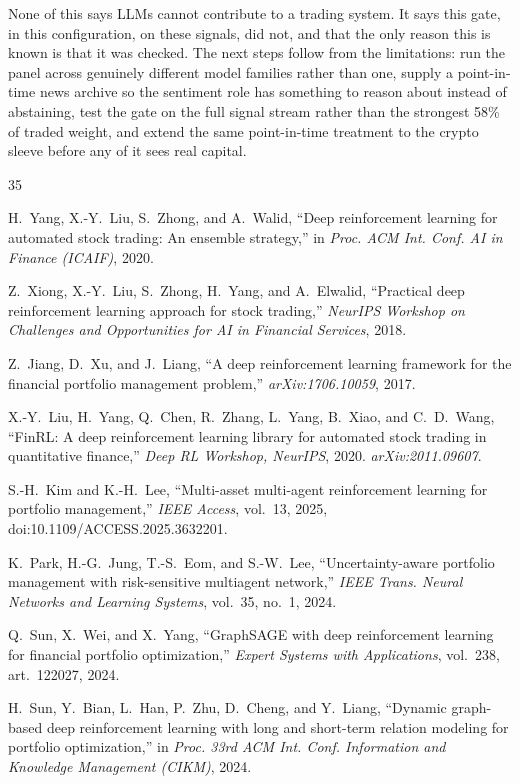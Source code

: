 \documentclass[10pt,twocolumn]{IEEEtran}
\begin{document}
None of this says LLMs cannot contribute to a trading system. It says this
gate, in this configuration, on these signals, did not, and that the only
reason this is known is that it was checked. The next steps follow from the
limitations: run the panel across genuinely different model families rather
than one, supply a point-in-time news archive so the sentiment role has
something to reason about instead of abstaining, test the gate on the full
signal stream rather than the strongest 58\% of traded weight, and extend the
same point-in-time treatment to the crypto sleeve before any of it sees real
capital.

\begin{thebibliography}{35}

H.~Yang, X.-Y.~Liu, S.~Zhong, and A.~Walid, ``Deep reinforcement learning
for automated stock trading: An ensemble strategy,'' in \emph{Proc. ACM
Int. Conf. AI in Finance (ICAIF)}, 2020.

Z.~Xiong, X.-Y.~Liu, S.~Zhong, H.~Yang, and A.~Elwalid, ``Practical deep
reinforcement learning approach for stock trading,'' \emph{NeurIPS Workshop
on Challenges and Opportunities for AI in Financial Services}, 2018.

Z.~Jiang, D.~Xu, and J.~Liang, ``A deep reinforcement learning framework for
the financial portfolio management problem,'' \emph{arXiv:1706.10059}, 2017.

X.-Y.~Liu, H.~Yang, Q.~Chen, R.~Zhang, L.~Yang, B.~Xiao, and C.~D.~Wang,
``FinRL: A deep reinforcement learning library for automated stock trading in
quantitative finance,'' \emph{Deep RL Workshop, NeurIPS}, 2020.
\emph{arXiv:2011.09607}.

S.-H.~Kim and K.-H.~Lee, ``Multi-asset multi-agent reinforcement learning for
portfolio management,'' \emph{IEEE Access}, vol.~13, 2025,
doi:10.1109/ACCESS.2025.3632201.

K.~Park, H.-G.~Jung, T.-S.~Eom, and S.-W.~Lee, ``Uncertainty-aware portfolio
management with risk-sensitive multiagent network,'' \emph{IEEE Trans. Neural
Networks and Learning Systems}, vol.~35, no.~1, 2024.

Q.~Sun, X.~Wei, and X.~Yang, ``GraphSAGE with deep reinforcement learning for
financial portfolio optimization,'' \emph{Expert Systems with Applications},
vol.~238, art.~122027, 2024.

H.~Sun, Y.~Bian, L.~Han, P.~Zhu, D.~Cheng, and Y.~Liang, ``Dynamic graph-based
deep reinforcement learning with long and short-term relation modeling for
portfolio optimization,'' in \emph{Proc. 33rd ACM Int. Conf. Information and
Knowledge Management (CIKM)}, 2024.


\end{thebibliography}
\end{document}
